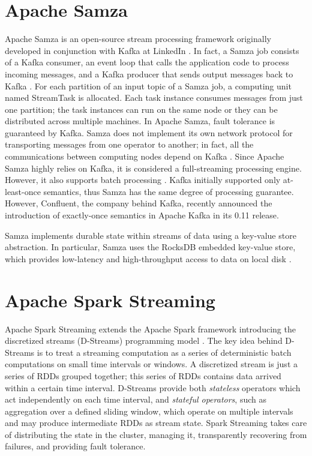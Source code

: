 \section{Apache Samza}
Apache Samza \cite{apachesamzaonline} is an open-source stream processing framework originally developed in conjunction with Kafka at LinkedIn \cite{philosophydistributeddata}. In fact, a Samza job consists of a Kafka consumer, an event loop that calls the application code to process incoming messages, and a Kafka producer that sends output messages back to Kafka \cite{philosophydistributeddata}. For each partition of an input topic of a Samza job, a computing unit named StreamTask is allocated. Each task instance consumes messages from just one partition; the task instances can run on the same node or they can be distributed across multiple machines. In Apache Samza, fault tolerance is guaranteed by Kafka. Samza does not implement its own network protocol for transporting messages from one operator to another; in fact, all the communications between computing nodes depend on Kafka \cite{philosophydistributeddata}. Since Apache Samza highly relies on Kafka, it is considered a full-streaming processing engine. However, it also supports batch processing \cite{philosophydistributeddata}. Kafka initially supported only at-least-once semantics, thus Samza has the same degree of processing guarantee. However, Confluent, the company behind Kafka, recently announced the introduction of exactly-once semantics in Apache Kafka in its 0.11 release.

Samza implements durable state within streams of data using a key-value store abstraction. In particular, Samza uses the RocksDB \cite{rocksdbonline} embedded key-value store, which provides low-latency and high-throughput access to data on local disk \cite{philosophydistributeddata}. 

\section{Apache Spark Streaming}
Apache Spark Streaming \cite{apachesparkstreamingonline} extends the Apache Spark framework introducing the discretized streams (D-Streams) programming model \cite{apachesparkstreaming}. The key idea behind D-Streams is to treat a streaming computation as a series of deterministic batch computations on small time intervals or windows. A discretized stream is just a series of RDDs  grouped together; this series of RDDs contains data arrived within a certain time interval. D-Streams provide both \emph{stateless} operators which act independently on each time interval, and \emph{stateful operators}, such as aggregation over a defined sliding window, which operate on multiple intervals and may produce intermediate RDDs as stream state. Spark Streaming takes care of distributing the state in the cluster, managing it, transparently recovering from failures, and providing fault tolerance.

